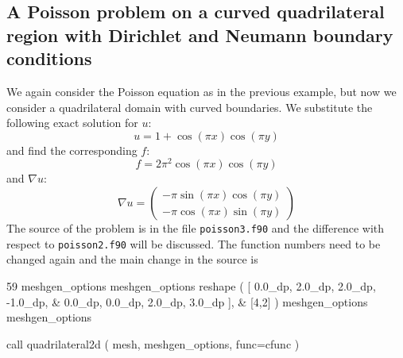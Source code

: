 \subsection{A Poisson problem on a curved quadrilateral region with Dirichlet 
            and Neumann boundary conditions} 
\label{sec:poisson3}

We again consider the Poisson equation as in the previous example, but now we
consider a quadrilateral domain with curved boundaries.
We substitute the following exact solution for $u$:
\begin{equation}
     u=1+\cos(\pi x)\cos(\pi y)
\end{equation}
and find the corresponding $f$:
\begin{equation}
     f=2\pi^2\cos(\pi x)\cos(\pi y)
\end{equation}
and $\nabla u$:
\begin{equation}
   \nabla u=
\begin{pmatrix}
     -\pi\sin(\pi x)\cos(\pi y) \\
     -\pi\cos(\pi x)\sin(\pi y) 
\end{pmatrix}
\end{equation}
The source of the problem is in the file \texttt{poisson3.f90} and the
difference with respect to \texttt{poisson2.f90} will be discussed. 
The function numbers need to be changed again and the main change in the
source is
\begin{listing}{59}
  meshgen_options%
  meshgen_options%
    reshape ( [ 0.0_dp, 2.0_dp, 2.0_dp, -1.0_dp,    &
                0.0_dp, 0.0_dp, 2.0_dp,  3.0_dp ], &
              [4,2] )
  meshgen_options%
  meshgen_options%
                                                                                
  call quadrilateral2d ( mesh, meshgen_options, func=cfunc )
   
\end{listing}
